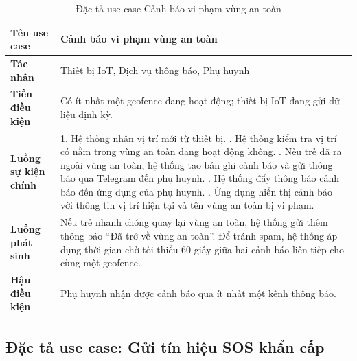 \documentclass[../DoAn.tex]{subfiles}
\begin{document}
\begin{table}[H]
\centering
\caption{Đặc tả use case Cảnh báo vi phạm vùng an toàn}
\label{table:uc_alert}
\begin{tabular}{|l|p{9.5cm}|}
\hline
\textbf{Tên use case}       & Cảnh báo vi phạm vùng an toàn \\
\hline
\textbf{Tác nhân}           & Thiết bị IoT, Dịch vụ thông báo, Phụ huynh \\
\hline
\textbf{Tiền điều kiện}     & Có ít nhất một geofence đang hoạt động; thiết bị IoT đang gửi dữ liệu định kỳ. \\
\hline
\textbf{Luồng sự kiện chính} &
1. Hệ thống nhận vị trí mới từ thiết bị. \newline
2. Hệ thống kiểm tra vị trí có nằm trong vùng an toàn đang hoạt động không. \newline
3. Nếu trẻ đã ra ngoài vùng an toàn, hệ thống tạo bản ghi cảnh báo và gửi thông báo qua Telegram đến phụ huynh. \newline
4. Hệ thống đẩy thông báo cảnh báo đến ứng dụng của phụ huynh. \newline
5. Ứng dụng hiển thị cảnh báo với thông tin vị trí hiện tại và tên vùng an toàn bị vi phạm. \\
\hline
\textbf{Luồng phát sinh}    & Nếu trẻ nhanh chóng quay lại vùng an toàn, hệ thống gửi thêm thông báo ``Đã trở về vùng an toàn''. Để tránh spam, hệ thống áp dụng thời gian chờ tối thiểu 60 giây giữa hai cảnh báo liên tiếp cho cùng một geofence. \\
\hline
\textbf{Hậu điều kiện}      & Phụ huynh nhận được cảnh báo qua ít nhất một kênh thông báo. \\
\hline
\end{tabular}
\end{table}

\subsection{Đặc tả use case: Gửi tín hiệu SOS khẩn cấp}
\end{document}
